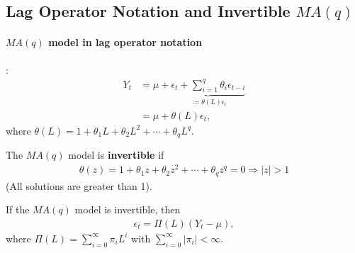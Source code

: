 \documentclass[11pt]{elegantbook}
\begin{document}
\subsection{Lag Operator Notation and Invertible $MA(q)$}
\paragraph*{$MA(q)$ model in lag operator notation}:
\begin{equation}
    \begin{aligned}
        Y_t&=\mu+\underbrace{\epsilon_t+\sum_{i=1}^{q}\theta_i\epsilon_{t-i}}_{:=\theta(L)\epsilon_t}\\
        &=\mu + \theta(L)\epsilon_t,
    \end{aligned}
    \nonumber
\end{equation}
where $\theta(L)=1+\theta_1 L + \theta_2 L^2 + \cdots + \theta_q L^q$.
\begin{definition}[Invertibility of $MA(q)$]
    The $MA(q)$ model is \textbf{invertible} if \begin{equation}
        \begin{aligned}
            \theta(z)=1+\theta_1 z + \theta_2 z^2 + \cdots + \theta_q z^q=0 \Rightarrow |z|>1
        \end{aligned}
        \nonumber
    \end{equation}
    (All solutions are greater than 1).
\end{definition}
\begin{note}
    If the $MA(q)$ model is invertible, then
    \begin{equation}
        \begin{aligned}
            \epsilon_t=\Pi(L)(Y_t-\mu),
        \end{aligned}
        \nonumber
    \end{equation}
    where $\Pi(L)=\sum_{i=0}^\infty \pi_i L^i$ with $\sum_{i=0}^\infty |\pi_i|<\infty$.
\end{note}
\end{document}
